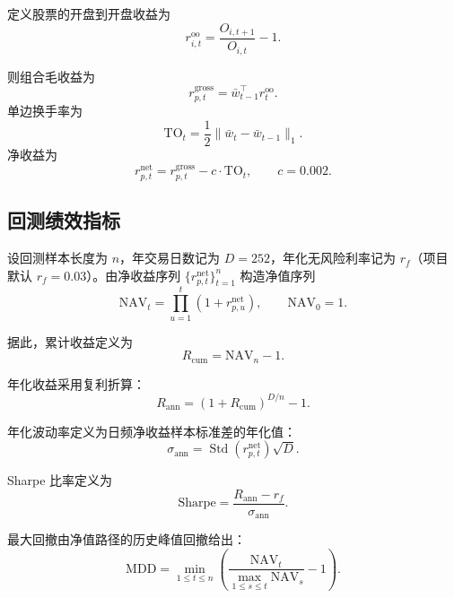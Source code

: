 \documentclass[12pt, a4paper, oneside]{article}
\newcommand{\Std}{\operatorname{Std}}
\begin{document}
定义股票的开盘到开盘收益为
\begin{equation}
r_{i,t}^{\mathrm{oo}} = \frac{O_{i,t+1}}{O_{i,t}} - 1.
\end{equation}

则组合毛收益为
\begin{equation}
r_{p,t}^{\mathrm{gross}} = \bar w_{t-1}^\top r_t^{\mathrm{oo}}.
\end{equation}
单边换手率为
\begin{equation}
\mathrm{TO}_t = \frac{1}{2}\|\bar w_t - \bar w_{t-1}\|_1.
\end{equation}
净收益为
\begin{equation}
r_{p,t}^{\mathrm{net}} = r_{p,t}^{\mathrm{gross}} - c\cdot \mathrm{TO}_t, \qquad c = 0.002.
\end{equation}

\subsection{回测绩效指标}

设回测样本长度为 \(n\)，年交易日数记为 \(D=252\)，年化无风险利率记为 \(r_f\)（项目默认 \(r_f=0.03\)）。由净收益序列 \(\{r_{p,t}^{\mathrm{net}}\}_{t=1}^n\) 构造净值序列
\begin{equation}
\mathrm{NAV}_t = \prod_{u=1}^{t}(1+r_{p,u}^{\mathrm{net}}), \qquad \mathrm{NAV}_0 = 1.
\end{equation}

据此，累计收益定义为
\begin{equation}
R_{\mathrm{cum}} = \mathrm{NAV}_n - 1.
\end{equation}

年化收益采用复利折算：
\begin{equation}
R_{\mathrm{ann}} = (1 + R_{\mathrm{cum}})^{D/n} - 1.
\end{equation}

年化波动率定义为日频净收益样本标准差的年化值：
\begin{equation}
\sigma_{\mathrm{ann}} = \Std(r_{p,t}^{\mathrm{net}})\sqrt{D}.
\end{equation}

Sharpe 比率定义为
\begin{equation}
\mathrm{Sharpe} = \frac{R_{\mathrm{ann}} - r_f}{\sigma_{\mathrm{ann}}}.
\end{equation}

最大回撤由净值路径的历史峰值回撤给出：
\begin{equation}
\mathrm{MDD} = \min_{1\le t\le n}\left(\frac{\mathrm{NAV}_t}{\max_{1\le s\le t}\mathrm{NAV}_s} - 1\right).
\end{equation}
\end{document}
